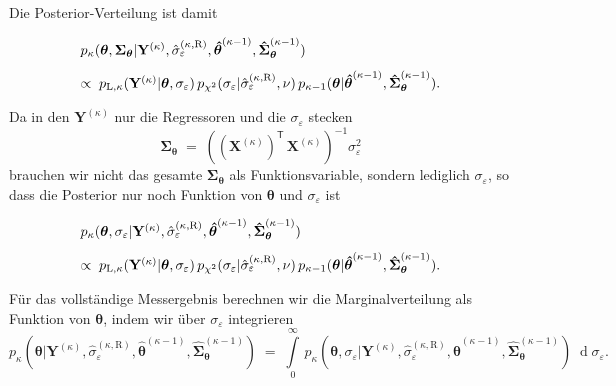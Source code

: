 Die Posterior-Verteilung ist damit
\begin{equation}
\arraycolsep=2.0pt\def\arraystretch{2.0}
\begin{array}{l}
p_{\kappa}(\boldsymbol{\theta}, \boldsymbol{\Sigma}_{\boldsymbol{\theta}} | \mathbf{Y}^{(\kappa)}, \hat \sigma_{\varepsilon}^{(\kappa,\mathrm{R})},  \boldsymbol{\hat \theta}^{(\kappa-1)},  \boldsymbol{\hat \Sigma}^{(\kappa-1)}_{\boldsymbol{\theta}}) \\
\propto
\; p_{\mathrm{L},\kappa} (\mathbf{Y}^{(\kappa)} | \boldsymbol{\theta}, \sigma_{\varepsilon}) \,
p_{\chi^2} (\sigma_{\varepsilon} | \hat \sigma_{\varepsilon}^{(\kappa,\mathrm{R})}, \nu) \,
p_{\kappa-1}(\boldsymbol{\theta} | \boldsymbol{\hat \theta}^{(\kappa-1)},
\boldsymbol{\hat \Sigma}^{(\kappa-1)}_{\boldsymbol{\theta}})  .
\end{array}
\end{equation}
Da in den $\mathbf{Y}^{(\kappa)}$ nur die Regressoren und die $\sigma_{\varepsilon}$ stecken
$$
\boldsymbol{\Sigma}_{\boldsymbol{\theta}} \; = \;
\left( \left(\mathbf{X}^{(\kappa)}\right)^\mathsf{T} \, \mathbf{X}^{(\kappa)} \right)^{-1}
\sigma_{\varepsilon}^2
$$
brauchen wir nicht das gesamte $\boldsymbol{\Sigma}_{\boldsymbol{\theta}}$ als Funktionsvariable,
sondern lediglich $\sigma_{\varepsilon}$, so dass die Posterior nur noch
Funktion von $\boldsymbol{\theta}$ und $\sigma_{\varepsilon}$ ist
\begin{equation}
\arraycolsep=2.0pt\def\arraystretch{2.0}
\begin{array}{l}
p_{\kappa}(\boldsymbol{\theta}, \sigma_{\varepsilon} | \mathbf{Y}^{(\kappa)}, \hat \sigma_{\varepsilon}^{(\kappa,\mathrm{R})},  \boldsymbol{\hat \theta}^{(\kappa-1)},  \boldsymbol{\hat \Sigma}^{(\kappa-1)}_{\boldsymbol{\theta}}) \\
\propto
\; p_{\mathrm{L},\kappa} (\mathbf{Y}^{(\kappa)} | \boldsymbol{\theta}, \sigma_{\varepsilon}) \,
p_{\chi^2} (\sigma_{\varepsilon} | \hat \sigma_{\varepsilon}^{(\kappa,\mathrm{R})}, \nu) \,
p_{\kappa-1}(\boldsymbol{\theta} | \boldsymbol{\hat \theta}^{(\kappa-1)},
\boldsymbol{\hat \Sigma}^{(\kappa-1)}_{\boldsymbol{\theta}})  .
\end{array}
\label{posteriorRegression}
\end{equation}
Für das vollständige Messergebnis berechnen wir die Marginalverteilung als Funktion von
$\boldsymbol{\theta}$, indem wir über $\sigma_{\varepsilon}$ integrieren
\begin{equation}
p_{\kappa}(\boldsymbol{\theta}| \mathbf{Y}^{(\kappa)}, \hat \sigma_{\varepsilon}^{(\kappa,\mathrm{R})},  \boldsymbol{\hat \theta}^{(\kappa-1)},  \boldsymbol{\hat \Sigma}^{(\kappa-1)}_{\boldsymbol{\theta}}) \; = \;
\int\limits_0^\infty \, p_{\kappa}(\boldsymbol{\theta}, \sigma_{\varepsilon} | \mathbf{Y}^{(\kappa)}, \hat \sigma_{\varepsilon}^{(\kappa,\mathrm{R})},  \boldsymbol{\hat \theta}^{(\kappa-1)},  \boldsymbol{\hat \Sigma}^{(\kappa-1)}_{\boldsymbol{\theta}}) \;
\operatorname{d}\sigma_{\varepsilon} .
\end{equation}

